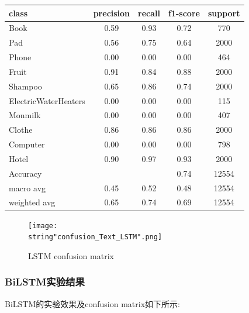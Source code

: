 \documentclass[UTF8]{ctexart}
\begin{document}
\begin{tabular}{|l|c|c|c|c|} %
    \hline 
    class & precision & recall & f1-score & support\\
    \hline 
    Book &0.59 &0.93&0.72&770\\
    Pad &0.56&0.75&0.64&2000\\
    Phone &0.00&0.00&0.00&464\\
    Fruit &0.91&0.84&0.88&2000\\
    Shampoo &0.65&0.86&0.74&2000\\
    ElectricWaterHeaters &0.00&0.00&0.00&115\\ 
    Monmilk &0.00&0.00&0.00&407\\
    Clothe &0.86&0.86&0.86&2000\\
    Computer &0.00&0.00&0.00&798\\
    Hotel &0.90&0.97&0.93&2000\\
    Accuracy & &&0.74&12554\\
    macro avg & 0.45&0.52&0.48&12554\\
    weighted avg &0.65 &0.74&0.69&12554\\
    \hline 
\end{tabular}

\begin{figure}[H]
    \begin{center}
        \texttt{[image: \\string"confusion\_Text\_LSTM".png]}
    \caption{LSTM confusion matrix}
    \label{fig:10}
    \end{center}
    \end{figure}
\par

\subsubsection{BiLSTM实验结果}
BiLSTM的实验效果及confusion matrix如下所示:\par
\end{document}
